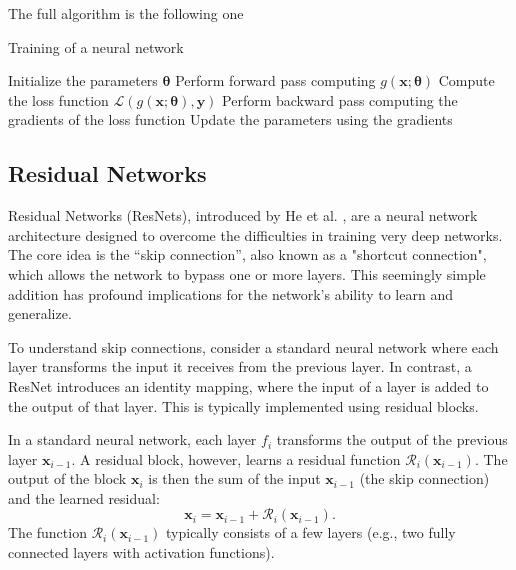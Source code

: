 The full algorithm is the following one \cite{Rumelhart_Hinton_Williams_1986}
\begin{algorithm}
    \caption{Training of a neural network}
    \begin{algorithmic}
        \State Initialize the parameters \( \bm{\theta} \)
                \State Perform forward pass computing \( g(\bm{x}; \bm{\theta}) \)
                \State Compute the loss function \( \mathcal{L}(g(\bm{x}; \bm{\theta}), \bm{y}) \)
                \State Perform backward pass computing the gradients of the loss function
                \State Update the parameters using the gradients
            \EndFor
        \EndWhile
    \end{algorithmic}
\end{algorithm}

\subsection{Residual Networks}
Residual Networks (ResNets), introduced by He et al. \cite{He_Zhang_Ren_Sun_2015}, are a neural network architecture designed to overcome the difficulties in training very deep networks. The core idea is the ``skip connection'', also known as a "shortcut connection", which allows the network to bypass one or more layers. This seemingly simple addition has profound implications for the network's ability to learn and generalize.

To understand skip connections, consider a standard neural network where each layer transforms the input it receives from the previous layer. In contrast, a ResNet introduces an identity mapping, where the input of a layer is added to the output of that layer. This is typically implemented using residual blocks.


In a standard neural network, each layer \(f_i\) transforms the output of the previous layer \( \bm{x}_{i-1} \). A residual block, however, learns a residual function \( \mathcal{R}_i(\bm{x}_{i-1}) \). The output of the block \( \bm{x}_i \) is then the sum of the input \( \bm{x}_{i-1} \) (the skip connection) and the learned residual:
\begin{equation}
    \bm{x}_i = \bm{x}_{i-1} + \mathcal{R}_i(\bm{x}_{i-1}).
\end{equation}
The function \( \mathcal{R}_i(\bm{x}_{i-1}) \) typically consists of a few layers (e.g., two fully connected layers with activation functions).

